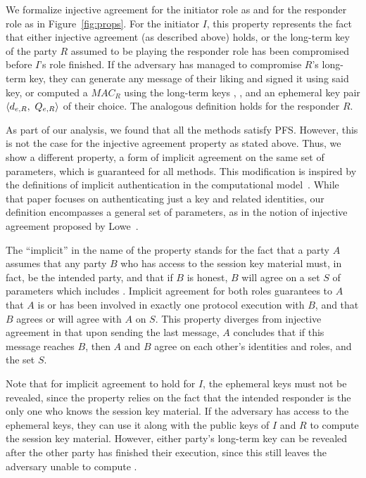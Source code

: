 %
We formalize injective agreement for the initiator role as \mPredInjI{} and for the responder role as \mPredInjR{} in Figure~\ref{fig:props}.
%
For the initiator $I$, this property represents the fact that either injective agreement (as described above) holds, or the long-term key of the party $R$ assumed to be playing the responder role has been compromised before $I$'s role finished.
%
If the adversary has managed to compromise $R$'s long-term key, they can generate any message of their liking and signed it using said key, or computed a $\mathit{MAC}_{R}$ using the long-term keys , , and an ephemeral key pair $\langle d_{e,R},\ Q_{e,R}\rangle$ of their choice.
%
The analogous definition holds for the responder $R$.

As part of our analysis, we found that all the \mEdhoc{} methods satisfy PFS.
%
However, this is not the case for the injective agreement property as stated above.
%
Thus, we show a different property, a form of implicit agreement on the same set of parameters, which is guaranteed for all methods.
%
This modification is inspired by the definitions of implicit authentication in the computational model~\cite{DBLP:conf/csfw/GuilhemFW20}.
%
While that paper focuses on authenticating just a key and related identities, our definition encompasses a general set of parameters, as in the notion of injective agreement proposed by Lowe~\cite{DBLP:conf/csfw/Lowe97a}.

The ``implicit'' in the name of the property stands for the fact that a party $A$ assumes that any party $B$ who has access to the session key material \mSessKey{} must, in fact, be the intended party, and that if $B$ is honest, $B$ will agree on a set $S$ of parameters which includes \mSessKey.
%
Implicit agreement for both roles guarantees to $A$ that $A$ is or has been involved in exactly one protocol execution with $B$, and that $B$ agrees or will agree with $A$ on $S$.
%
This property diverges from injective agreement in that upon sending the last message, $A$ concludes that if this message reaches $B$, then $A$ and $B$ agree on each other's identities and roles, and the set $S$.

Note that for implicit agreement to hold for $I$, the ephemeral keys must not be revealed, since the property relies on the fact that the intended responder is the only one who knows the session key material.
%
If the adversary has access to the ephemeral keys, they can use it along with the public keys of $I$ and $R$ to compute the session key material.
%
However, either party's long-term key can be revealed after the other party has finished their execution, since this still leaves the adversary unable to compute \mGxy{}.


